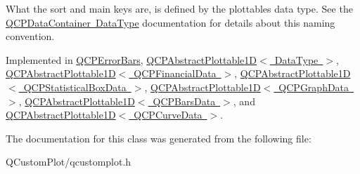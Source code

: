 What the sort and main keys are, is defined by the plottable\textquotesingle{}s data type. See the \mbox{\hyperlink{class_q_c_p_data_container_qcpdatacontainer-datatype}{Q\+C\+P\+Data\+Container Data\+Type}} documentation for details about this naming convention. 

Implemented in \mbox{\hyperlink{class_q_c_p_error_bars_aa00fcef7b0cb5c54bafe32ab4b16e674}{Q\+C\+P\+Error\+Bars}}, \mbox{\hyperlink{class_q_c_p_abstract_plottable1_d_a022e8905f5a667d8379493d6a037e79f}{Q\+C\+P\+Abstract\+Plottable1\+D$<$ Data\+Type $>$}}, \mbox{\hyperlink{class_q_c_p_abstract_plottable1_d_a022e8905f5a667d8379493d6a037e79f}{Q\+C\+P\+Abstract\+Plottable1\+D$<$ Q\+C\+P\+Financial\+Data $>$}}, \mbox{\hyperlink{class_q_c_p_abstract_plottable1_d_a022e8905f5a667d8379493d6a037e79f}{Q\+C\+P\+Abstract\+Plottable1\+D$<$ Q\+C\+P\+Statistical\+Box\+Data $>$}}, \mbox{\hyperlink{class_q_c_p_abstract_plottable1_d_a022e8905f5a667d8379493d6a037e79f}{Q\+C\+P\+Abstract\+Plottable1\+D$<$ Q\+C\+P\+Graph\+Data $>$}}, \mbox{\hyperlink{class_q_c_p_abstract_plottable1_d_a022e8905f5a667d8379493d6a037e79f}{Q\+C\+P\+Abstract\+Plottable1\+D$<$ Q\+C\+P\+Bars\+Data $>$}}, and \mbox{\hyperlink{class_q_c_p_abstract_plottable1_d_a022e8905f5a667d8379493d6a037e79f}{Q\+C\+P\+Abstract\+Plottable1\+D$<$ Q\+C\+P\+Curve\+Data $>$}}.



The documentation for this class was generated from the following file\+:\begin{DoxyCompactItemize}
\item 
Q\+Custom\+Plot/qcustomplot.\+h\end{DoxyCompactItemize}

